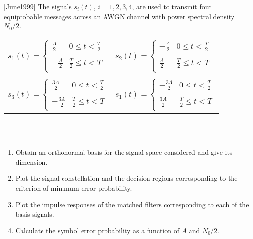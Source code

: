 \documentclass[es,boletin]{uah}
\begin{document}
{
[June1999] The signals $s_i(t)$, $i=1,2,3,4$, are used to transmit four equiprobable messages across an AWGN channel with power spectral density $N_0/2$. 
	\ \\
	
	\begin{tabular}[h!]{ll}
	$ s_1(t) = \left \{
		\begin{array}{ll}
			\frac{A}{2} & 0 \leq t <\frac{T}{2} \\
			& \\
			-\frac{A}{2} & \frac{T}{2} \leq t < T \\
		\end{array} \right.$
	&
	$ s_2(t) = \left \{
		\begin{array}{ll}
			-\frac{A}{2} & 0 \leq t <\frac{T}{2} \\
			& \\
			\frac{A}{2} & \frac{T}{2} \leq t < T \\
		\end{array} \right.$ \\
		& \\
	$ s_3(t) = \left \{
		\begin{array}{ll}
			\frac{3A}{2} & 0 \leq t <\frac{T}{2} \\
			& \\
			-\frac{3A}{2} & \frac{T}{2} \leq t < T \\
		\end{array} \right.$
	&
	$ s_1(t) = \left \{
		\begin{array}{ll}
			-\frac{3A}{2} & 0 \leq t <\frac{T}{2} \\
			& \\
			\frac{3A}{2} & \frac{T}{2} \leq t < T \\
		\end{array} \right.$
	\end{tabular}
	\ \\
	\ \\
	\begin{enumerate}
		\item Obtain an orthonormal basis for the signal space considered and give its dimension.
		\item Plot the signal constellation and the decision regions corresponding to the criterion of minimum error probability.
		\item Plot the impulse responses of the matched filters corresponding to each of the basis signals.
		\item Calculate the symbol error probability as a function of $A$ and $N_0/2$.
	\end{enumerate}

}
\end{document}
